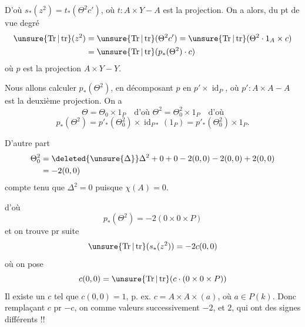 D'où $s_*(z^2)=t_*(\Theta^2c')$, où $t:A\times Y\mathbin{-}A$ est la projection. On a alors, du pt de vue degré
\[
\begin{aligned}
\unsure{\operatorname{Tr}|\operatorname{tr}}(z^2)&=\unsure{\operatorname{Tr}|\operatorname{tr}}(\Theta^2c')=\unsure{\operatorname{Tr}|\operatorname{tr}}(\Theta^2\cdot1_A\times c)\\
&=\unsure{\operatorname{Tr}|\operatorname{tr}}(p_*(\Theta^2)\cdot c)
\end{aligned}
\]
où $p$ est la projection $A\times Y\mathbin{-}Y$.


Nous allons calculer $p_*(\Theta^2)$, en décomposant $p$ en $p'\times\operatorname{id}_P$, où $p':A\times A\mathbin{-}A$ est la deuxième projection. On a
\[
\Theta=\Theta_0\times1_P\quad\text{d'où }\Theta^2=\Theta_0^2\times1_P\quad\text{d'où}
\]
\[
p_*(\Theta^2)=p'_*(\Theta_0^2)\times\operatorname{id}_{P*}(1_P)=p'_*(\Theta_0^2)\times1_P.
\]


D'autre part
\[
\begin{aligned}
\Theta_0^2&=\deleted{\unsure{\Delta}}\Delta^2+0+0-2(0,0)-2(0,0)+2(0,0)\\
&=-2(0,0)
\end{aligned}
\]
compte tenu que $\Delta^2=0$  puisque $\chi(A)=0$.

d'où
\[
p_*(\Theta^2)=-2(0\times0\times P)
\]
et on trouve pr suite
\[
\unsure{\operatorname{Tr}|\operatorname{tr}}(s_*(z^2))=-2c(0,0)
\]
où on pose
\[
c(0,0)=\unsure{\operatorname{Tr}|\operatorname{tr}}(c\cdot(0\times0\times P))
\]
Il existe un $c$ tel que $c(0,0)=1$, p. ex. $c=A\times A\times(a)$, où $a\in P(k)$. Donc remplaçant  $c$ pr $-c$, on  comme valeurs successivement $-2$, et $2$, qui ont des signes différents !!




